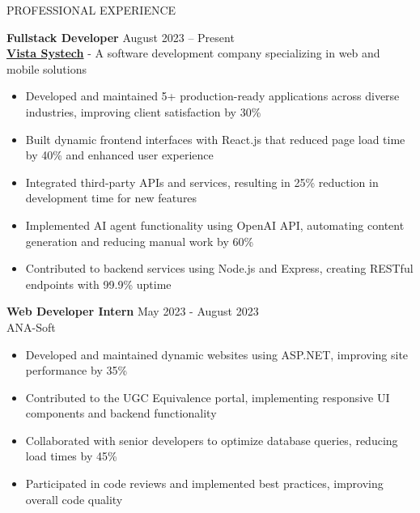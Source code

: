 \documentclass{resume} %
\begin{document}
\begin{rSection}{PROFESSIONAL EXPERIENCE}

\textbf{Fullstack Developer} \hfill August 2023 – Present\\
\textbf{\href{https://vistasystech.com/}{Vista Systech}} - A software development company specializing in web and mobile solutions

\begin{itemize}
    \itemsep -3pt {}
    \item Developed and maintained 5+ production-ready applications across diverse industries, improving client satisfaction by 30\%
    \item Built dynamic frontend interfaces with React.js that reduced page load time by 40\% and enhanced user experience
    \item Integrated third-party APIs and services, resulting in 25\% reduction in development time for new features
    \item Implemented AI agent functionality using OpenAI API, automating content generation and reducing manual work by 60\%
    \item Contributed to backend services using Node.js and Express, creating RESTful endpoints with 99.9\% uptime
\end{itemize}

\textbf{Web Developer Intern} \hfill May 2023 - August 2023\\
ANA-Soft 

\begin{itemize}
    \itemsep -3pt {}
    \item Developed and maintained dynamic websites using ASP.NET, improving site performance by 35\%
    \item Contributed to the UGC Equivalence portal, implementing responsive UI components and backend functionality
    \item Collaborated with senior developers to optimize database queries, reducing load times by 45\%
    \item Participated in code reviews and implemented best practices, improving overall code quality
\end{itemize}

\end{rSection} 

\end{document}
